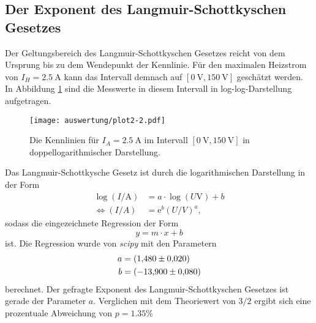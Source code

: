 \subsection{Der Exponent des Langmuir-Schottkyschen Gesetzes}
\label{sec:langschott}
Der Geltungsbereich des Langmuir-Schottkyschen Gesetzes reicht von dem Ursprung bis zu dem Wendepunkt der Kennlinie. Für den maximalen Heizstrom
von $I_H=\SI{2.5}{\ampere}$ kann das Intervall demnach auf $[\SI{0}{\volt}, \SI{150}{\volt}]$ geschätzt werden. In Abbildung \ref{fig:plot2} sind
die Messwerte in diesem Intervall in log-log-Darstellung aufgetragen.
\begin{figure}[H]
    \centering
    \texttt{[image: auswertung/plot2-2.pdf]}
    \caption{Die Kennlinien für $I_A=\SI{2.5}{\ampere}$ im Intervall $[\SI{0}{\volt}, \SI{150}{\volt}]$ in doppellogarithmischer Darstellung.}
    \label{fig:plot2}
\end{figure}
\noindent
Das Langmuir-Schottkysche Gesetz ist durch die logarithmischen Darstellung in der Form
\begin{align*}
    \log(I/\si{\ampere})&=a\cdot \log(U\si{\volt})+b\\
    \Leftrightarrow
    (I/A)&=\text{e}^b(U/V)^{a},  %
\end{align*}
sodass die eingezeichnete Regression der Form
\begin{equation}
    y=m\cdot x+b
    \label{eqn:gerade}
\end{equation}
ist. Die Regression wurde von \textit{scipy} \cite{scipy} mit den Parametern
\begin{align*}
    a &= \SI{1.48   \pm 0.020}{} \\
    b &= \SI{-13.90 \pm 0.080}{}
\end{align*}
berechnet. Der gefragte Exponent des Langmuir-Schottkyschen Gesetzes ist gerade der Parameter $a$. Verglichen mit dem Theoriewert von $3/2$
ergibt sich eine prozentuale Abweichung von $p=\num{1.35}\%$

